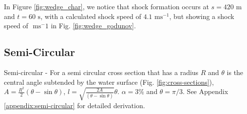 \documentclass[12pt]{article}
\begin{document}
In Figure \ref{fig:wedge_char}, we notice that shock formation occurs at $s= 420\text{ m}$ and $t= 60\text{ s}$, with a calculated shock speed of $ 4.1\text{ ms}^{-1}$, but showing a shock speed of $ \text{ ms}^-1$ in Fig. \ref{fig:wedge_godunov}.

\subsection{Semi-Circular}
Semi-circular - For a semi circular cross section that has a radius $R$ and $\theta$ is the central angle subtended by the water surface (Fig. \ref{fig:cross-sections}), $A = \frac{R^2}{2}\left(\theta - \sin\theta\right)$, $l = \sqrt{\frac{2A}{\left(\theta - \sin\theta\right)}}\theta$. $\alpha = 3\%$ and $\theta = \pi/3$. See Appendix \ref{appendix:semi-circular} for detailed derivation.
\end{document}
